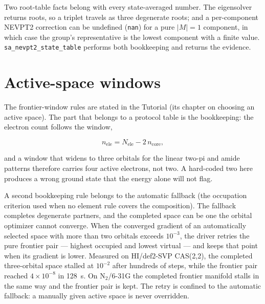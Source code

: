 Two root-table facts belong with every state-averaged number.  The
eigensolver returns roots, so a triplet travels as three degenerate
roots; and a per-component NEVPT2 correction can be undefined
(\texttt{nan}) for a pure $|M| = 1$ component, in which case the
group's representative is the lowest component with a finite value.
\texttt{sa\_nevpt2\_state\_table} performs both bookkeeping and
returns the evidence.

\section{Active-space windows}

The frontier-window rules are stated in the Tutorial (its chapter on
choosing an active space).  The part that belongs to a protocol table
is the bookkeeping: the electron count follows the window,

\begin{equation}
  n_\mathrm{ele} = N_\mathrm{ele} - 2\, n_\mathrm{core},
\end{equation}

and a window that widens to three orbitals for the linear two-pi and
amide patterns therefore carries four active electrons, not two.  A
hard-coded two here produces a wrong ground state that the energy
alone will not flag.

A second bookkeeping rule belongs to the automatic fallback (the
occupation criterion used when no element rule covers the
composition).  The fallback completes degenerate partners, and the
completed space can be one the orbital optimizer cannot converge.
When the converged gradient of an automatically selected space with
more than two orbitals exceeds $10^{-3}$, the driver retries the pure
frontier pair --- highest occupied and lowest virtual --- and keeps
that point when its gradient is lower.  Measured on
HI/def2-SVP CAS(2,2), the completed three-orbital space stalled at
$10^{-2}$ after hundreds of steps, while the frontier pair reached
$4\times10^{-8}$ in 128~s.  On N$_2$/6-31G the completed frontier
manifold stalls in the same way and the frontier pair is kept.  The
retry is confined to the automatic fallback: a manually given active
space is never overridden.

